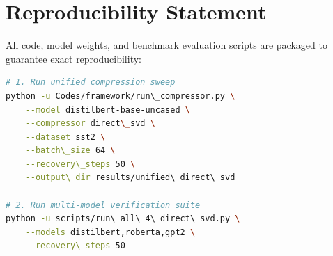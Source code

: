 \section{Reproducibility Statement}
All code, model weights, and benchmark evaluation scripts are packaged to guarantee exact reproducibility:
\begin{lstlisting}[language=bash]
# 1. Run unified compression sweep
python -u Codes/framework/run\_compressor.py \
    --model distilbert-base-uncased \
    --compressor direct\_svd \
    --dataset sst2 \
    --batch\_size 64 \
    --recovery\_steps 50 \
    --output\_dir results/unified\_direct\_svd

# 2. Run multi-model verification suite
python -u scripts/run\_all\_4\_direct\_svd.py \
    --models distilbert,roberta,gpt2 \
    --recovery\_steps 50
\end{lstlisting}
